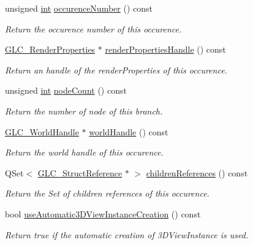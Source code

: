 \begin{DoxyCompactItemize}
unsigned \hyperlink{ioapi_8h_a787fa3cf048117ba7123753c1e74fcd6}{int} \hyperlink{class_g_l_c___struct_occurence_a1636bc3898831aa6d80513e18691a5b9}{occurence\-Number} () const 
\begin{DoxyCompactList}\small\item\em Return the occurence number of this occurence. \end{DoxyCompactList}\item 
\hyperlink{class_g_l_c___render_properties}{G\-L\-C\-\_\-\-Render\-Properties} $\ast$ \hyperlink{class_g_l_c___struct_occurence_ab57b2c91897dad08a81c7ac9671a50b4}{render\-Properties\-Handle} () const 
\begin{DoxyCompactList}\small\item\em Return an handle of the render\-Properties of this occurence. \end{DoxyCompactList}\item 
unsigned \hyperlink{ioapi_8h_a787fa3cf048117ba7123753c1e74fcd6}{int} \hyperlink{class_g_l_c___struct_occurence_a117c6f6b869f5fe2a69bb455a3d9702f}{node\-Count} () const 
\begin{DoxyCompactList}\small\item\em Return the number of node of this branch. \end{DoxyCompactList}\item 
\hyperlink{class_g_l_c___world_handle}{G\-L\-C\-\_\-\-World\-Handle} $\ast$ \hyperlink{class_g_l_c___struct_occurence_acadf653fdd6453eb07ea79364d462964}{world\-Handle} () const 
\begin{DoxyCompactList}\small\item\em Return the world handle of this occurence. \end{DoxyCompactList}\item 
Q\-Set$<$ \hyperlink{class_g_l_c___struct_reference}{G\-L\-C\-\_\-\-Struct\-Reference} $\ast$ $>$ \hyperlink{class_g_l_c___struct_occurence_a569b520c2cf13ff4ca706fd521bf1e93}{children\-References} () const 
\begin{DoxyCompactList}\small\item\em Return the Set of children references of this occurence. \end{DoxyCompactList}\item 
bool \hyperlink{class_g_l_c___struct_occurence_ad79bdf08181ecef3f6261a63889025b4}{use\-Automatic3\-D\-View\-Instance\-Creation} () const 
\begin{DoxyCompactList}\small\item\em Return true if the automatic creation of 3\-D\-View\-Instance is used. \end{DoxyCompactList}\item 

\end{DoxyCompactItemize}
